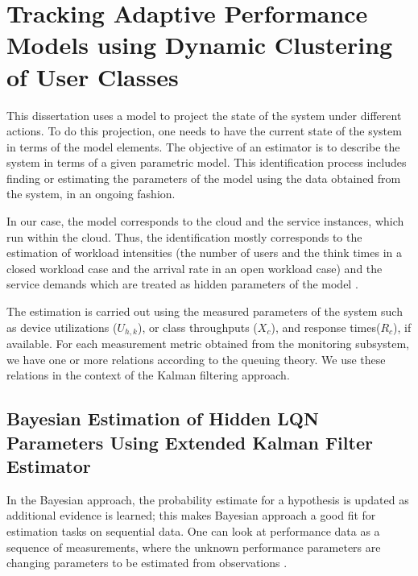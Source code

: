  \chapter{Tracking Adaptive Performance Models using Dynamic Clustering of User Classes}
 \label{ch:estimation} 

  This dissertation uses a model to project the state of the system under different actions. 
 To do this projection, one needs to have the current state of the system in terms of the model elements. The objective of an estimator is to describe the system in terms of a given parametric model. This identification process includes finding or estimating the parameters of the model using the data obtained from the system, in an ongoing fashion.  
 
 In our case, the model corresponds to the cloud and the service instances, which run within the cloud. Thus, the identification mostly corresponds to the estimation of workload intensities (the number of users and the think times in a closed workload case and the arrival rate in an open workload case) and the service demands which are treated as hidden parameters of the model
\cite{
rolia_parameter_1995,
rolia_correlating_1998,
courtois_using_2000,
pacifici_cpu_2008,
zhang_regression-based_2007,
zhang_workload_2002,
liu_parameter_2006,
gmach_workload_2007,
gmach_capacity_2007}. 

  The estimation is carried out using the measured parameters of the system such as device utilizations ($U_{h,k}$), or class throughputs ($X_{c}$), and response times($R_c$), if available.
     For each measurement metric obtained from the monitoring subsystem, we have one or more relations according to the queuing theory. We use these relations in the context of the Kalman filtering approach.  
		
		
  \section{Bayesian Estimation of Hidden LQN Parameters Using Extended Kalman Filter Estimator}    
  \label{sec:bayesian-estimation}  
   In the Bayesian approach, the probability estimate for a hypothesis is updated as additional evidence is learned; this makes Bayesian approach a good fit for estimation tasks on sequential data. One can look at performance data as a sequence of measurements, where the unknown performance parameters are changing parameters to be estimated from observations \cite{woodside_use_2005,xu_performance_2005,zheng_tracking_2005}.
   
